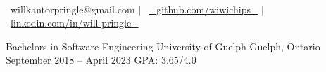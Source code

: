 \documentclass[]{awesome-cv}
\begin{document}
    
\begin{center}
	\headerfirstnamestyle{}  \\
	\vspace{2mm}
	{\faEnvelope\ willkantorpringle@gmail.com} | {\faGithub\ \href{https://github.com/wiwichips}{⠀github.com/wiwichips⠀}} | {\faLinkedin\ \href{https://www.linkedin.com/in/will-pringle/}{linkedin.com/in/will-pringle⠀}}
\end{center}
\begin{cventries}
	\cventry
	{Bachelors in Software Engineering}
	{University of Guelph}
	{Guelph, Ontario}
	{September 2018 – April 2023}
	{GPA: 3.65/4.0}
\end{cventries}
\end{document}
